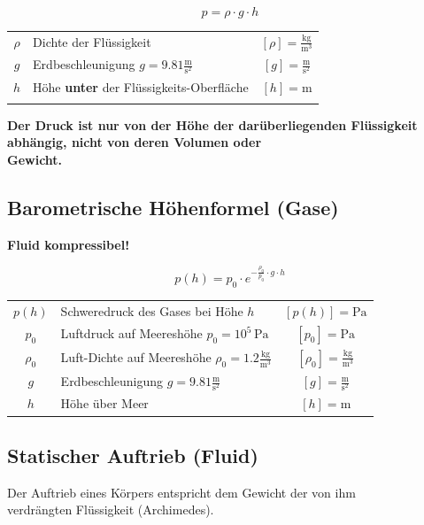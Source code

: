 $$ \boxed{ p = \rho \cdot g \cdot h }$$	


	\begin{tabular}{c l c}
		\rule{0pt}{8pt}$\rho$ & Dichte der Flüssigkeit & $[\rho] = \mathrm{\frac{kg}{m^3}}$ \\
		\rule{0pt}{8pt}$g$ & Erdbeschleunigung $g = 9.81 \mathrm{\frac{m}{s^2}}$ & $[g] = \mathrm{\frac{m}{s^2}}$ \\
		$h$ & Höhe \textbf{unter} der Flüssigkeits-Oberfläche & $[h] = \mathrm{m}$ \\
		\\
	\end{tabular}
	
	\textbf{Der Druck ist nur von der Höhe der darüberliegenden Flüssigkeit abhängig, nicht von deren Volumen oder \\
	Gewicht.}
	
	

\subsection{Barometrische Höhenformel (Gase)}
\textbf{Fluid kompressibel!} 

$$ \boxed{ p(h) = p_0 \cdot e^ {- \frac{\rho_0}{p_0} \cdot g \cdot h} }$$	


	\begin{tabular}{c l c}
	$p(h)$ & Schweredruck des Gases bei Höhe $h$ & $[p(h)] = \mathrm{Pa}$ \\
	$p_0$ & Luftdruck auf Meereshöhe $p_0 = 10^5 \, \mathrm{Pa}$ & $[p_0] = \mathrm{Pa}$ \\ 
		\rule{0pt}{8pt}$\rho_0$ & Luft-Dichte auf Meereshöhe $\rho_0 = 1.2 \mathrm{\frac{kg}{m^3}}$ & $[\rho_0] = \mathrm{\frac{kg}{m^3}}$ \\
		\rule{0pt}{8pt}$g$ & Erdbeschleunigung $g = 9.81 \mathrm{\frac{m}{s^2}}$ & $[g] = \mathrm{\frac{m}{s^2}}$ \\
		$h$ & Höhe über Meer & $[h] = \mathrm{m}$ \\
	\end{tabular}
	
\subsection{Statischer Auftrieb (Fluid)}
Der Auftrieb eines Körpers entspricht dem Gewicht der von ihm \\
verdrängten Flüssigkeit (Archimedes). 


